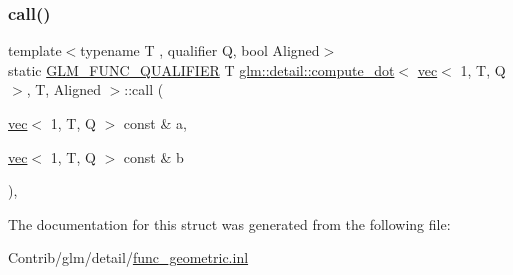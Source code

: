 \subsubsection{\texorpdfstring{call()}{call()}}
{\footnotesize\ttfamily template$<$typename T , qualifier Q, bool Aligned$>$ \\
static \mbox{\hyperlink{setup_8hpp_a33fdea6f91c5f834105f7415e2a64407}{G\+L\+M\+\_\+\+F\+U\+N\+C\+\_\+\+Q\+U\+A\+L\+I\+F\+I\+ER}} T \mbox{\hyperlink{structglm_1_1detail_1_1compute__dot}{glm\+::detail\+::compute\+\_\+dot}}$<$ \mbox{\hyperlink{structglm_1_1vec}{vec}}$<$ 1, T, Q $>$, T, Aligned $>$\+::call (\begin{DoxyParamCaption}\item[{\mbox{\hyperlink{structglm_1_1vec}{vec}}$<$ 1, T, Q $>$ const \&}]{a,  }\item[{\mbox{\hyperlink{structglm_1_1vec}{vec}}$<$ 1, T, Q $>$ const \&}]{b }\end{DoxyParamCaption})\hspace{0.3cm}{\ttfamily [inline]}, {\ttfamily [static]}}



The documentation for this struct was generated from the following file\+:\begin{DoxyCompactItemize}
\item 
Contrib/glm/detail/\mbox{\hyperlink{func__geometric_8inl}{func\+\_\+geometric.\+inl}}\end{DoxyCompactItemize}

